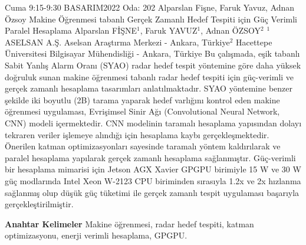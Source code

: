 
    \begin{abstract_basarim}
    {Cuma 9:15-9:30}
    {BASARIM2022}
    {Oda: 202}
    {Alparslan Fişne, Faruk Yavuz, Adnan Özsoy}
    {Makine Öğrenmesi tabanlı Gerçek Zamanlı Hedef Tespiti için Güç Verimli Paralel Hesaplama}
    {%
    Alparslan FİŞNE$^{1}$, Faruk YAVUZ$^{1}$, Adnan ÖZSOY$^{2}$}
    {%
    }
    {%
    $^1$ ASELSAN A.Ş. Aselsan Araştırma Merkezi - Ankara, Türkiye\newline{}$^2$ Hacettepe Üniversitesi Bilgisayar Mühendisliği - Ankara, Türkiye}
    Bu çalışmada, eşik tabanlı Sabit Yanlış Alarm Oranı (SYAO) radar hedef tespit yöntemine göre daha yüksek doğruluk sunan makine öğrenmesi tabanlı radar hedef tespiti için güç-verimli ve gerçek zamanlı hesaplama tasarımları anlatılmaktadır. SYAO yöntemine benzer şekilde iki boyutlu (2B) tarama yaparak hedef varlığını kontrol eden makine öğrenmesi uygulaması, Evrişimsel Sinir Ağı (Convolutional Neural Network, CNN) modeli içermektedir. CNN modelinin taramalı hesaplama yapısından dolayı tekraren veriler işlemeye alındığı için hesaplama kaybı gerçekleşmektedir. Önerilen katman optimizasyonları sayesinde taramalı yöntem kaldırılarak ve paralel hesaplama yapılarak gerçek zamanlı hesaplama sağlanmıştır. Güç-verimli bir hesaplama mimarisi için Jetson AGX Xavier GPGPU birimiyle 15 W ve 30 W güç modlarında Intel Xeon W-2123 CPU biriminden sırasıyla 1.2x ve 2x hızlanma sağlanmış olup düşük güç tüketimi ile gerçek zamanlı tespit uygulaması başarıyla gerçekleştirilmiştir. 
    
            \textbf{Anahtar Kelimeler} \newline{}Makine öğrenmesi, radar hedef tespiti, katman optimizasyonu, enerji verimli hesaplama, GPGPU.
    \end{abstract_basarim}
    